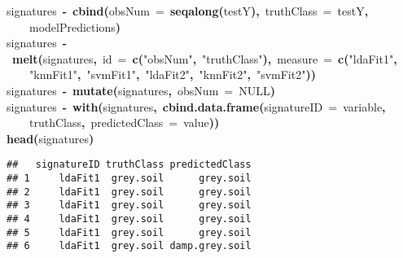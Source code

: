 \documentclass{article}
\makeatletter
\newcommand{\hlfunctioncall}[1]{\textcolor[rgb]{.5,0,.33}{\textbf{#1}}}%
\newcommand{\hlstring}[1]{\textcolor[rgb]{.6,.6,1}{#1}}%
\newcommand{\hlkeyword}[1]{\textbf{#1}}%
\newcommand{\hlargument}[1]{\textcolor[rgb]{.69,.25,.02}{#1}}%
\newcommand{\hlassignement}[1]{\textbf{#1}}%
\newcommand{\hlsymbol}[1]{#1}%
\newcommand{\hlstd}[1]{\textcolor[rgb]{0,0,0}{#1}}%
\newenvironment{kframe}{%
 \def\FrameCommand##1{\hskip\@totalleftmargin \hskip-\fboxsep
 \colorbox{shadecolor}{##1}\hskip-\fboxsep
     \hskip-\linewidth \hskip-\@totalleftmargin \hskip\columnwidth}%
 \MakeFramed {\advance\hsize-\width
   \@totalleftmargin\z@ \linewidth\hsize
   \@setminipage}}%
 {\par\unskip\endMakeFramed}
\newenvironment{knitrout}{}{} %
\makeatother
\begin{document}
\begin{knitrout}
\color{fgcolor}\begin{kframe}
\begin{flushleft}
\ttfamily\noindent
\hlsymbol{signatures}{\ }\hlassignement{\usebox{\hlnormalsizeboxlessthan}-}{\ }\hlfunctioncall{cbind}\hlkeyword{(}\hlargument{obsNum}{\ }\hlargument{=}{\ }\hlfunctioncall{seq\usebox{\hlnormalsizeboxunderscore}along}\hlkeyword{(}\hlsymbol{testY}\hlkeyword{)}\hlkeyword{,}{\ }\hlargument{truthClass}{\ }\hlargument{=}{\ }\hlsymbol{testY}\hlkeyword{,}\hspace*{\fill}\\
\hlstd{}{\ }{\ }{\ }{\ }\hlsymbol{modelPredictions}\hlkeyword{)}\hspace*{\fill}\\
\hlstd{}\hlsymbol{signatures}{\ }\hlassignement{\usebox{\hlnormalsizeboxlessthan}-}{\ }\hlfunctioncall{melt}\hlkeyword{(}\hlsymbol{signatures}\hlkeyword{,}{\ }\hlargument{id}{\ }\hlargument{=}{\ }\hlfunctioncall{c}\hlkeyword{(}\hlstring{"{}obsNum"{}}\hlkeyword{,}{\ }\hlstring{"{}truthClass"{}}\hlkeyword{)}\hlkeyword{,}{\ }\hlargument{measure}{\ }\hlargument{=}{\ }\hlfunctioncall{c}\hlkeyword{(}\hlstring{"{}ldaFit1"{}}\hlkeyword{,}\hspace*{\fill}\\
\hlstd{}{\ }{\ }{\ }{\ }\hlstring{"{}knnFit1"{}}\hlkeyword{,}{\ }\hlstring{"{}svmFit1"{}}\hlkeyword{,}{\ }\hlstring{"{}ldaFit2"{}}\hlkeyword{,}{\ }\hlstring{"{}knnFit2"{}}\hlkeyword{,}{\ }\hlstring{"{}svmFit2"{}}\hlkeyword{)}\hlkeyword{)}\hspace*{\fill}\\
\hlstd{}\hlsymbol{signatures}{\ }\hlassignement{\usebox{\hlnormalsizeboxlessthan}-}{\ }\hlfunctioncall{mutate}\hlkeyword{(}\hlsymbol{signatures}\hlkeyword{,}{\ }\hlargument{obsNum}{\ }\hlargument{=}{\ }NULL\hlkeyword{)}\hspace*{\fill}\\
\hlstd{}\hlsymbol{signatures}{\ }\hlassignement{\usebox{\hlnormalsizeboxlessthan}-}{\ }\hlfunctioncall{with}\hlkeyword{(}\hlsymbol{signatures}\hlkeyword{,}{\ }\hlfunctioncall{cbind.data.frame}\hlkeyword{(}\hlargument{signatureID}{\ }\hlargument{=}{\ }\hlsymbol{variable}\hlkeyword{,}\hspace*{\fill}\\
\hlstd{}{\ }{\ }{\ }{\ }\hlsymbol{truthClass}\hlkeyword{,}{\ }\hlargument{predictedClass}{\ }\hlargument{=}{\ }\hlsymbol{value}\hlkeyword{)}\hlkeyword{)}\hspace*{\fill}\\
\hlstd{}\hlfunctioncall{head}\hlkeyword{(}\hlsymbol{signatures}\hlkeyword{)}\mbox{}
\normalfont
\end{flushleft}
\begin{verbatim}
##   signatureID truthClass predictedClass
## 1     ldaFit1  grey.soil      grey.soil
## 2     ldaFit1  grey.soil      grey.soil
## 3     ldaFit1  grey.soil      grey.soil
## 4     ldaFit1  grey.soil      grey.soil
## 5     ldaFit1  grey.soil      grey.soil
## 6     ldaFit1  grey.soil damp.grey.soil
\end{verbatim}
\end{kframe}
\end{knitrout}
\end{document}
